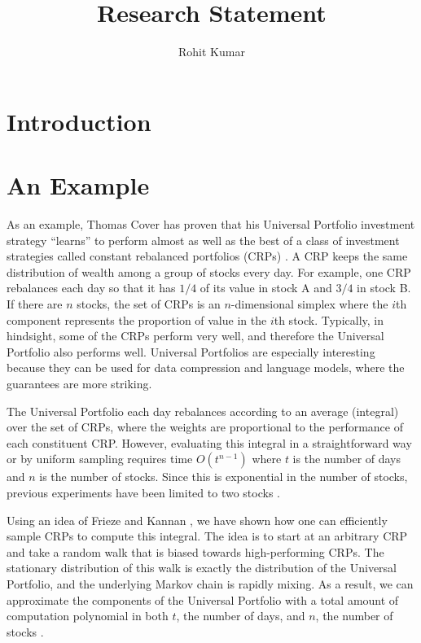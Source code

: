 ﻿	



\title{Research Statement}
\author{Rohit Kumar}
\maketitle

\section{Introduction}

\section{An Example}
As an example, Thomas Cover has proven that his Universal Portfolio investment
strategy ``learns'' to perform almost as well as the best of a class of
investment strategies called constant rebalanced portfolios (CRPs) \cite{Cover}.  A CRP
keeps the same distribution of wealth among a group of stocks every day.  For
example, one CRP rebalances each day so that it has $1/4$ of its value in
stock A and $3/4$ in stock B.  If there are $n$ stocks, the set of CRPs is an
$n$-dimensional simplex where the $i$th component represents the proportion of
value in the $i$th stock.  Typically, in hindsight, some of the CRPs perform
very well, and therefore the Universal Portfolio also performs well.
Universal Portfolios are especially interesting because they can be used for
data compression and language models, where the guarantees are more striking.

The Universal Portfolio each day rebalances according to an average (integral)
over the set of CRPs, where the weights are proportional to the performance of
each constituent CRP.  However, evaluating this integral in a straightforward
way or by uniform sampling requires time $O(t^{n-1})$ where $t$ is the number
of days and $n$ is the number of stocks.  Since this is exponential in the
number of stocks, previous experiments have been limited to two stocks
\cite{Cover, BK, Helmbold}.

Using an idea of Frieze and Kannan \cite{FK}, we have shown how one can
efficiently sample CRPs to compute this integral.  The idea is to start at an
arbitrary CRP and take a random walk that is biased towards high-performing
CRPs.  The stationary distribution of this walk is exactly the distribution of
the Universal Portfolio, and the underlying Markov chain is rapidly mixing.
As a result, we can approximate the components of the Universal Portfolio with
a total amount of computation polynomial in both $t$, the number of days, and
$n$, the number of stocks \cite{KV}.


